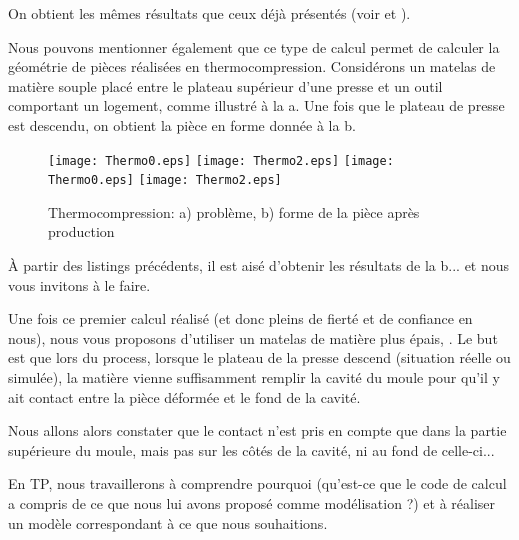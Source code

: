 On obtient les mêmes résultats que ceux déjà présentés (voir  et ).

\bigskip
Nous pouvons mentionner également que ce type de calcul permet de calculer la géométrie de pièces réalisées en thermocompression. Considérons un matelas de matière souple placé entre le plateau supérieur d'une presse et un outil comportant un logement, comme illustré à la a. Une fois que le plateau de presse est descendu, on obtient la pièce en forme donnée à la b.

\begin{figure}[ht]
  \center
  \ifVersionDuDocEstVincent
     \texttt{[image: Thermo0.eps]} \hfill
     \texttt{[image: Thermo2.eps]}
  \else
     \texttt{[image: Thermo0.eps]} \hfill
     \texttt{[image: Thermo2.eps]}
  \fi
  \caption{\label{Fig-Thermo} Thermocompression: a) problème, b) forme de la pièce après production}
\end{figure}

\medskip
À partir des listings précédents, il est aisé d'obtenir les résultats de la b... et nous vous invitons à le faire.

\medskip
Une fois ce premier calcul réalisé (et donc pleins de fierté et de confiance en nous), nous vous proposons d'utiliser un matelas de matière plus épais, . Le but est que lors du process, lorsque le plateau de la presse descend (situation réelle ou simulée), la matière vienne suffisamment remplir la cavité du moule pour qu'il y ait contact entre la pièce déformée et le fond de la cavité.

\bigskip
Nous allons alors constater que le contact n'est pris en compte que dans la partie supérieure du moule, mais pas sur les côtés de la cavité, ni au fond de celle-ci...

En TP, nous travaillerons à comprendre pourquoi (qu'est-ce que le code de calcul a compris de ce que nous lui avons proposé comme modélisation ?) et à réaliser un modèle correspondant à ce que nous souhaitions.
